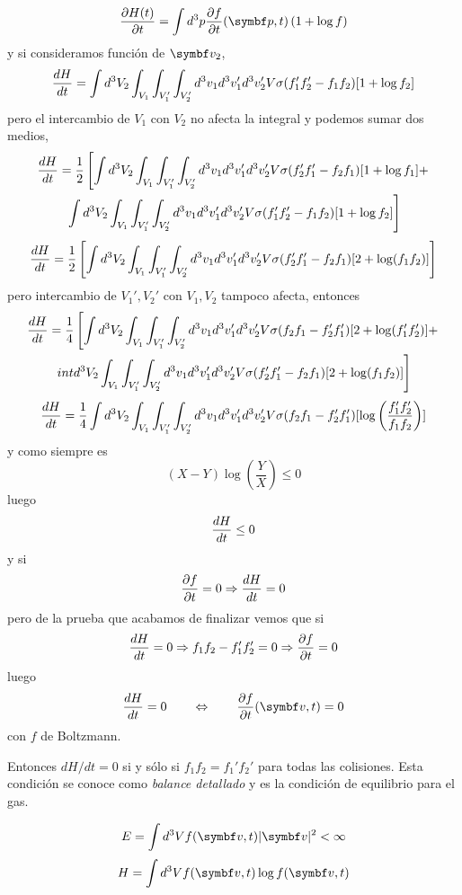 \documentclass[10pt,oneside]{CBFT_book}
\begin{document}
\[
	\dpar{H(t)}{t} = \int d^3p \dpar{f}{t}(\vb{p},t)  \left( 1 + \log f \right)
\]
y si consideramos función de $\vb{v}_2$,
\[
	\frac{d^{\hspace{-0.05em}} {H}}{d {t}^{\hspace{-0.05em}}} = \int d^3V_2 
	\int_{V_1} \int_{V_1'} \int_{V_2'} d^3v_1 d^3v_1' d^3v_2' V \sigma 
	(f_1'f_2' - f_1f_2) [1 + \log f_2]
\]
pero el intercambio de $V_1$ con $V_2$ no afecta la integral y podemos sumar dos medios,
\begin{multline*}
 \frac{d^{\hspace{-0.05em}} {H}}{d {t}^{\hspace{-0.05em}}} = \frac{1}{2} \left[ \int d^3V_2 
	\int_{V_1} \int_{V_1'} \int_{V_2'} d^3v_1 d^3v_1' d^3v_2' V \sigma 
	(f_2'f_1' - f_2f_1) [1 + \log f_1] + \right.\\
	\left. \int d^3V_2 \int_{V_1} \int_{V_1'} \int_{V_2'} d^3v_1 d^3v_1' d^3v_2' V \sigma 
	(f_1'f_2' - f_1f_2) [1 + \log f_2] \right]
\end{multline*}
\[
 \frac{d^{\hspace{-0.05em}} {H}}{d {t}^{\hspace{-0.05em}}} = \frac{1}{2} \left[ \int d^3V_2 
	\int_{V_1} \int_{V_1'} \int_{V_2'} d^3v_1 d^3v_1' d^3v_2' V \sigma 
	(f_2'f_1' - f_2f_1) [2 + \log (f_1 f_2)] \right] 
\]
pero intercambio de $V_1',V_2'$ con $V_1,V_2$ tampoco afecta, entonces
\begin{multline*}
  \frac{d^{\hspace{-0.05em}} {H}}{d {t}^{\hspace{-0.05em}}} = \frac{1}{4} \left[ \int d^3V_2 
	\int_{V_1} \int_{V_1'} \int_{V_2'} d^3v_1 d^3v_1' d^3v_2' V \sigma 
	(f_2f_1 - f_2'f_1') [2 + \log (f_1' f_2')] + \right. \\
	\left. int d^3V_2 
	\int_{V_1} \int_{V_1'} \int_{V_2'} d^3v_1 d^3v_1' d^3v_2' V \sigma 
	(f_2'f_1' - f_2f_1) [2 + \log (f_1 f_2)] \right] 
\end{multline*}
\[
	\frac{d^{\hspace{-0.05em}} {H}}{d {t}^{\hspace{-0.05em}}} = \frac{1}{4} \int d^3V_2 
	\int_{V_1} \int_{V_1'} \int_{V_2'} d^3v_1 d^3v_1' d^3v_2' V \sigma 
	(f_2f_1 - f_2'f_1') [\log \left( \frac{f_1' f_2'}{f_1f_2} \right)]
\]
y como siempre es
\[
	(X-Y)\log\left( \frac{Y}{X} \right) \leq 0
\]
luego
\[
	\frac{d^{\hspace{-0.05em}} {H}}{d {t}^{\hspace{-0.05em}}} \leq 0 
\]
y si 
\[
	\frac{\partial^{\hspace{-0.05em}} {f}}{\partial {t}^{\hspace{-0.05em}}} = 0 \Rightarrow \frac{d^{\hspace{-0.05em}} {H}}{d {t}^{\hspace{-0.05em}}} = 0 
\]
pero de la prueba que acabamos de finalizar vemos que si 
\[
	\frac{d^{\hspace{-0.05em}} {H}}{d {t}^{\hspace{-0.05em}}} = 0 \Rightarrow f_1f_2 - f_1'f_2' = 0 \Rightarrow \frac{\partial^{\hspace{-0.05em}} {f}}{\partial {t}^{\hspace{-0.05em}}} = 0
\]
luego 
\[
	\dtot{H}{t} = 0 \qquad \Leftrightarrow \qquad \dpar{f}{t}(\vb{v},t) = 0
\]
con $f$ de Boltzmann.

Entonces $dH/dt = 0$ si y sólo si $f_1f_2 = f_1'f_2'$ para todas las colisiones. Esta 
condición se conoce como {\it balance detallado} y es la condición de equilibrio para
el gas.

\[
	E = \int d^3V f(\vb{v},t)|\vb{v}|^2 < \infty
\]
\[
	H = \int d^3V f(\vb{v},t) \log f(\vb{v},t) 
\]







\end{document}
